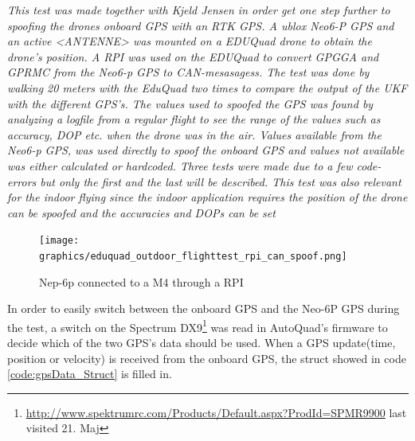 \textit{This test was made together with Kjeld Jensen in order get one step further to spoofing the drones onboard GPS with an RTK GPS. A ublox Neo6-P GPS and an active <ANTENNE> was mounted on a EDUQuad drone to obtain the drone's position. A RPI was used on the EDUQuad to convert GPGGA and GPRMC from the Neo6-p GPS to CAN-mesasagess.
The test was done by walking 20 meters with the EduQuad two times to compare the output of the UKF with the different GPS's.
The values used to spoofed the GPS was found by analyzing a logfile from a regular flight to see the range of the values such as accuracy, DOP etc. when the drone was in the air. 
Values available from the Neo6-p GPS, was used directly to spoof the onboard GPS and values not available was either calculated or hardcoded.
Three tests were made due to a few code-errors but only the first and the last will be described. This test was also relevant for the indoor flying since the indoor application requires the position of the drone can be spoofed and the accuracies and DOPs can be set}\\

\begin{figure}[H]
\centering
    \texttt{[image: graphics/eduquad\_outdoor\_flighttest\_rpi\_can\_spoof.png]}
	  \caption{Nep-6p connected to a M4 through a RPI}
    \label{fig:qground_station_dop}
\end{figure}


In order to easily switch between the onboard GPS and the Neo-6P GPS during the test, a switch on the Spectrum DX9\footnote{\url{http://www.spektrumrc.com/Products/Default.aspx?ProdId=SPMR9900} last visited 21. Maj} was read in AutoQuad's firmware to decide which of the two GPS's data should be used. When a GPS update(time, position or velocity) is received from the onboard GPS, the struct showed in code \ref{code:gpsData_Struct} is filled in. \\


